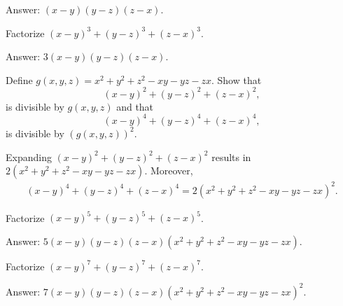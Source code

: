 \begin{solution}
Answer: $(x-y)(y-z)(z-x)$.
\end{solution}

\begin{tcolorbox}
\begin{question}
Factorize $(x-y)^3+(y-z)^3+(z-x)^3$.
\end{question}
\end{tcolorbox}

\begin{solution}
Answer: $3(x-y)(y-z)(z-x)$.
\end{solution}


\begin{tcolorbox}
\begin{question}
Define $g(x,y,z)=x^2+y^2+z^2-xy-yz-zx$. Show that \[(x-y)^2+(y-z)^2+(z-x)^2,\] is divisible by $g(x,y,z)$ and that \[(x-y)^4+(y-z)^4+(z-x)^4,\] is divisible by $\left(g(x,y,z)\right)^2$.
\end{question}
\end{tcolorbox}

\begin{solution}
Expanding $(x-y)^2+(y-z)^2+(z-x)^2$ results in $2(x^2+y^2+z^2-xy-yz-zx)$. Moreover,
\begin{align*}
    (x-y)^4+(y-z)^4+(z-x)^4 = 2(x^2+y^2+z^2-xy-yz-zx)^2.
\end{align*}
\end{solution}




\begin{tcolorbox}
\begin{question}
Factorize $(x-y)^5 + (y-z)^5 + (z-x)^5$.
\end{question}
\end{tcolorbox}

\begin{solution}[name=Solution by Parviz Shahriari]
Answer: $5(x-y)(y-z)(z-x)(x^2+y^2+z^2-xy-yz-zx)$.
\end{solution}


\begin{tcolorbox}
\begin{question}
Factorize $(x-y)^7 + (y-z)^7 + (z-x)^7$.
\end{question}
\end{tcolorbox}

\begin{solution}[name=Solution by Parviz Shahriari]
Answer: $7(x-y)(y-z)(z-x)(x^2+y^2+z^2-xy-yz-zx)^2$.
\end{solution}


